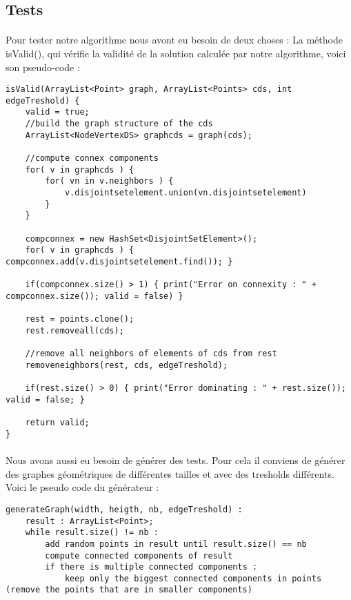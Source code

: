 \subsection{Tests}

\paragraph{}
Pour tester notre algorithme nous avont eu besoin de deux choses :
La méthode isValid(), qui vérifie la validité de la solution calculée par notre algorithme, voici son pseudo-code :
\begin{lstlisting}
isValid(ArrayList<Point> graph, ArrayList<Points> cds, int edgeTreshold) {
	valid = true;
	//build the graph structure of the cds
	ArrayList<NodeVertexDS> graphcds = graph(cds);
	
	//compute connex components
	for( v in graphcds ) {
		for( vn in v.neighbors ) {
			v.disjointsetelement.union(vn.disjointsetelement)
		}
	}
	
	compconnex = new HashSet<DisjointSetElement>();
	for( v in graphcds ) { compconnex.add(v.disjointsetelement.find()); }
	
	if(compconnex.size() > 1) { print("Error on connexity : " + compconnex.size()); valid = false) }
	
	rest = points.clone();
	rest.removeall(cds);
	
	//remove all neighbors of elements of cds from rest
	removeneighbors(rest, cds, edgeTreshold);
	
	if(rest.size() > 0) { print("Error dominating : " + rest.size()); valid = false; }
	
	return valid;
}
\end{lstlisting}

\paragraph{}
Nous avons aussi eu besoin de générer des tests. Pour cela il conviens de générer des graphes géométriques de différentes tailles et avec des tresholds différents.
Voici le pseudo code du générateur :
\begin{lstlisting}
generateGraph(width, heigth, nb, edgeTreshold) :
	result : ArrayList<Point>;
	while result.size() != nb :
		add random points in result until result.size() == nb
		compute connected components of result
		if there is multiple connected components :
			keep only the biggest connected components in points (remove the points that are in smaller components)
\end{lstlisting}

